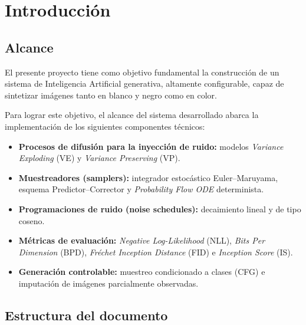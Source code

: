 \chapter{Introducción}
\label{cap:introduccion}

\section{Alcance}
\label{sec:alcance}

El presente proyecto tiene como objetivo fundamental la construcción de un
sistema de Inteligencia Artificial generativa, altamente configurable, capaz
de sintetizar imágenes tanto en blanco y negro como en color.

Para lograr este objetivo, el alcance del sistema desarrollado abarca la
implementación de los siguientes componentes técnicos:

\begin{itemize}
  \item \textbf{Procesos de difusión para la inyección de ruido:}
        modelos \emph{Variance Exploding} (VE) y \emph{Variance Preserving} (VP).
  \item \textbf{Muestreadores (samplers):} integrador estocástico
        Euler--Maruyama, esquema Predictor--Corrector y \emph{Probability
        Flow ODE} determinista.
  \item \textbf{Programaciones de ruido (noise schedules):} decaimiento
        lineal y de tipo coseno.
  \item \textbf{Métricas de evaluación:} \emph{Negative Log-Likelihood} (NLL),
        \emph{Bits Per Dimension} (BPD), \emph{Fréchet Inception Distance}
        (FID) e \emph{Inception Score} (IS).
  \item \textbf{Generación controlable:} muestreo condicionado a clases
        (CFG) e imputación de imágenes parcialmente observadas.
\end{itemize}

\section{Estructura del documento}
\label{sec:estructura}


